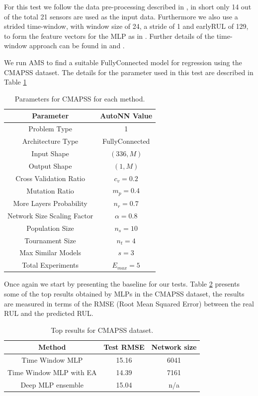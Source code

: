 \documentclass[journal]{IEEEtran}
\begin{document}
For this test we follow the data pre-processing described in \cite{Laredo2018}, in short only 14 out of the total 21 sensors are used as the input data. Furthermore we also use a strided time-window, with window size of 24, a stride of 1 and earlyRUL of 129, to form the feature vectors for the MLP as in \cite{Laredo2018}. Further details of the time-window approach can be found in \cite{Laredo2018} and \cite{Li2018}.

We run AMS to find a suitable FullyConnected model for regression using the CMAPSS dataset. The details for the parameter used in this test are described in Table \ref{table:CMAPSS_params}

\begin{table}[!htb]
\begin{center}
\begin{tabular}{| c | c |}
\hline
Parameter & AutoNN Value \\
\hline
Problem Type & 1 \\
Architecture Type & FullyConnected \\
Input Shape & $(336, M)$  \\
Output Shape & $(1, M)$ \\
Cross Validation Ratio & $c_v = 0.2$ \\
Mutation Ratio & $m_p = 0.4$ \\
More Layers Probability & $n_r = 0.7$ \\
Network Size Scaling Factor & $\alpha = 0.8$ \\
Population Size & $n_s = 10$ \\
Tournament Size & $n_t = 4$ \\
Max Similar Models & $s = 3$ \\
Total Experiments & $E_{max} = 5$ \\
\hline
\end{tabular}
\end{center}
\caption{Parameters for CMAPSS for each method.}
\label{table:CMAPSS_params}
\end{table}

Once again we start by presenting the baseline for our tests. Table \ref{table:CMAPSS_results_top} presents some of the top results obtained by MLPs in the CMAPSS dataset, the results are measured in terms of the RMSE (Root Mean Squared Error) between the real RUL and the predicted RUL. 

\begin{table}[!htb]
\begin{center}
\begin{tabular}{| c | c | c |}
\hline
Method & Test RMSE & Network size \\
\hline
Time Window MLP \cite{Lim2016} & 15.16 & 6041\\
Time Window MLP with EA \cite{Laredo2018} & 14.39 & 7161\\
Deep MLP ensemble \cite{Zhang2016} & 15.04 &  n/a \\
\hline
\end{tabular}
\end{center}
\caption{Top results for CMAPSS dataset.}
\label{table:CMAPSS_results_top}
\end{table}
\end{document}
